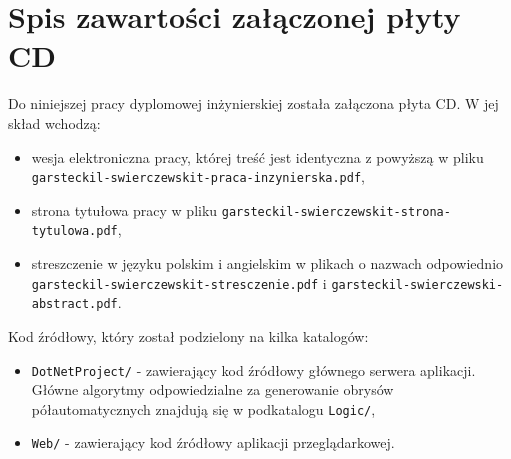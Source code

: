 \documentclass[a4paper,11pt,twoside,openright]{report}
\newcommand\blankpage{%
    \null
    \thispagestyle{empty}%
    \newpage}
\theoremstyle{definition}
\begin{document}


\afterpage{\blankpage}

\listoffigures
{}


\afterpage{\blankpage}




\chapter*{Spis zawartości załączonej płyty CD}

Do niniejszej pracy dyplomowej inżynierskiej została załączona płyta CD. W jej skład wchodzą:
\begin{itemize}[noitemsep]
\item wesja elektroniczna pracy, której treść jest identyczna z powyższą w
pliku \verb+garsteckil-swierczewskit-praca-inzynierska.pdf+,
\item strona tytułowa pracy w pliku \verb+garsteckil-swierczewskit-strona-tytulowa.pdf+,
\item streszczenie w języku polskim i angielskim w plikach o nazwach odpowiednio
\verb+garsteckil-swierczewskit-stresczenie.pdf+ i \verb+garsteckil-swierczewski-abstract.pdf+.
\end{itemize}

Kod źródłowy, który został podzielony na kilka katalogów:
\begin{itemize}
\item \verb+DotNetProject/+ - zawierający kod źródłowy głównego serwera aplikacji.
Główne algorytmy odpowiedzialne za generowanie obrysów półautomatycznych znajdują się w podkatalogu \verb+Logic/+,
\item \verb+Web/+ - zawierający kod źródłowy aplikacji przeglądarkowej.
\end{itemize}

\afterpage{\blankpage}

\end{document}
